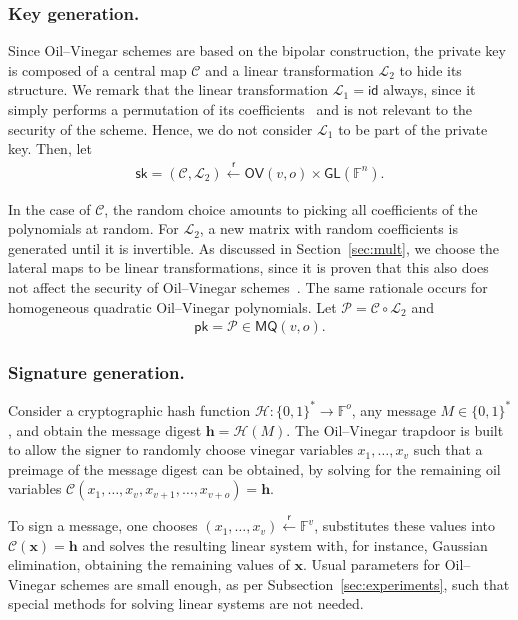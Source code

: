 \documentclass[12pt, a4paper, oneside]{memoir}
\newcommand{\random}{\overset{\mathsf{r}}{\gets}}
\theoremstyle{definition}
\begin{document}
\subsubsection{Key generation.}

Since Oil--Vinegar schemes are based on the bipolar construction, the private key is composed of a central map $\mathcal{C}$ and a linear transformation $\mathcal{L}_{2}$ to hide its structure. We remark that the linear transformation $\mathcal{L}_{1} = \mathsf{id}$ always, since it simply performs a permutation of its coefficients~\cite[p.~71]{Thomae:201306} and is not relevant to the security of the scheme. Hence, we do not consider $\mathcal{L}_{1}$ to be part of the private key. Then, let
\begin{align}
  \mathsf{sk} = (\mathcal{C}, \mathcal{L}_{2})
    \random \mathsf{OV}(v, o) \times \mathsf{GL}(\mathbb{F}^{n}).
\end{align}

In the case of $\mathcal{C}$, the random choice amounts to picking all coefficients of the polynomials at random. For $\mathcal{L}_{2}$, a new matrix with random coefficients is generated until it is invertible. As discussed in Section~\ref{sec:mult}, we choose the lateral maps to be linear transformations, since it is proven that this also does not affect the security of Oil--Vinegar schemes~\cite[Section 3.1]{Braeken:200502}. The same rationale occurs for homogeneous quadratic Oil--Vinegar polynomials. Let $\mathcal{P} = \mathcal{C} \circ \mathcal{L}_{2}$ and
\begin{align}
  \mathsf{pk} = \mathcal{P} \in \mathsf{MQ}(v, o).
\end{align}

\subsubsection{Signature generation.}

Consider a cryptographic hash function $\mathcal{H} : \{0, 1\}^{*} \to \mathbb{F}^{o}$, any message $M \in \{0, 1\}^{*}$, and obtain the message digest $\mathbf{h} = \mathcal{H}(M)$. The Oil--Vinegar trapdoor is built to allow the signer to randomly choose vinegar variables $x_{1}, \dots, x_{v}$ such that a preimage of the message digest can be obtained, by solving for the remaining oil variables $\mathcal{C}(x_{1}, \dots, x_{v}, x_{v + 1}, \dots, x_{v + o}) = \mathbf{h}$. 

To sign a message, one chooses $(x_{1}, \dots, x_{v}) \random \mathbb{F}^{v}$, substitutes these values into $\mathcal{C}(\mathbf{x}) = \mathbf{h}$ and solves the resulting linear system with, for instance, Gaussian elimination, obtaining the remaining values of $\mathbf{x}$. Usual parameters for Oil--Vinegar schemes are small enough, as per Subsection~\ref{sec:experiments}, such that special methods for solving linear systems are not needed. 
\end{document}
